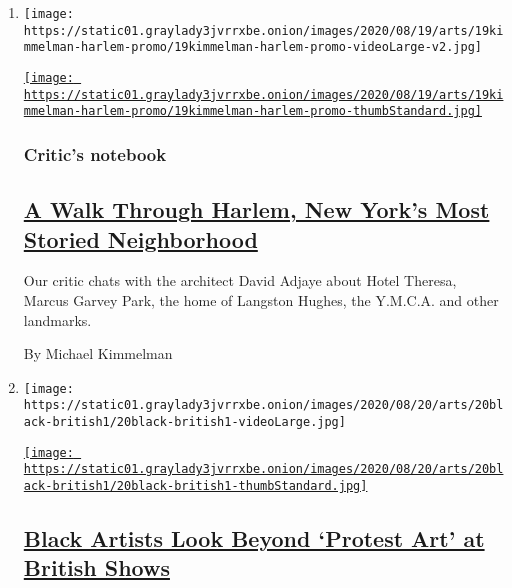 \begin{enumerate}
\def\labelenumi{\arabic{enumi}.}
\item
  \texttt{[image: https://static01.graylady3jvrrxbe.onion/images/2020/08/19/arts/19kimmelman-harlem-promo/19kimmelman-harlem-promo-videoLarge-v2.jpg]}

  \href{/2020/08/20/arts/design/harlem-virtual-tour.html}{\texttt{[image: https://static01.graylady3jvrrxbe.onion/images/2020/08/19/arts/19kimmelman-harlem-promo/19kimmelman-harlem-promo-thumbStandard.jpg]}}

  \hypertarget{critics-notebook}{%
  \subsubsection{Critic's notebook}\label{critics-notebook}}

  \hypertarget{a-walk-through-harlem-new-yorks-most-storied-neighborhood}{%
  \subsection{\texorpdfstring{\href{/2020/08/20/arts/design/harlem-virtual-tour.html}{A
  Walk Through Harlem, New York's Most Storied
  Neighborhood}}{A Walk Through Harlem, New York's Most Storied Neighborhood}}\label{a-walk-through-harlem-new-yorks-most-storied-neighborhood}}

  Our critic chats with the architect David Adjaye about Hotel Theresa,
  Marcus Garvey Park, the home of Langston Hughes, the Y.M.C.A. and
  other landmarks.

  By Michael Kimmelman
\item
  \texttt{[image: https://static01.graylady3jvrrxbe.onion/images/2020/08/20/arts/20black-british1/20black-british1-videoLarge.jpg]}

  \href{/2020/08/20/arts/design/black-artists-turner-contemporary-gallery.html}{\texttt{[image: https://static01.graylady3jvrrxbe.onion/images/2020/08/20/arts/20black-british1/20black-british1-thumbStandard.jpg]}}

  \hypertarget{black-artists-look-beyond-protest-art-at-british-shows}{%
  \subsection{\texorpdfstring{\href{/2020/08/20/arts/design/black-artists-turner-contemporary-gallery.html}{Black
  Artists Look Beyond `Protest Art' at British
  Shows}}{Black Artists Look Beyond `Protest Art' at British Shows}}\label{black-artists-look-beyond-protest-art-at-british-shows}}


\end{enumerate}
